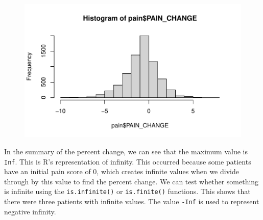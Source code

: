 \documentclass[
  letterpaper,
]{krantz}
\makeatletter
\newenvironment{Shaded}{\begin{snugshade}}{\end{snugshade}}
\newcommand{\CommentTok}[1]{\textcolor[rgb]{0.37,0.37,0.37}{#1}}
\newcommand{\FunctionTok}[1]{\textcolor[rgb]{0.28,0.35,0.67}{#1}}
\newcommand{\NormalTok}[1]{\textcolor[rgb]{0.00,0.23,0.31}{#1}}
\newcommand{\OtherTok}[1]{\textcolor[rgb]{0.00,0.23,0.31}{#1}}
\newcommand{\SpecialCharTok}[1]{\textcolor[rgb]{0.37,0.37,0.37}{#1}}
\newenvironment{kframe}{%
\medskip{}
\setlength{\fboxsep}{.8em}
 \def\at@end@of@kframe{}%
 \ifinner\ifhmode%
  \def\at@end@of@kframe{\end{minipage}}%
  \begin{minipage}{\columnwidth}%
 \fi\fi%
 \def\FrameCommand##1{\hskip\@totalleftmargin \hskip-\fboxsep
 \colorbox{shadecolor}{##1}\hskip-\fboxsep
     \hskip-\linewidth \hskip-\@totalleftmargin \hskip\columnwidth}%
 \MakeFramed {\advance\hsize-\width
   \@totalleftmargin\z@ \linewidth\hsize
   \@setminipage}}%
 {\par\unskip\endMakeFramed%
 \at@end@of@kframe}
\renewenvironment{Shaded}{\begin{kframe}}{\end{kframe}}
\makeatother
\begin{document}
\begin{figure}[H]

{\centering \includegraphics[width=1\textwidth,height=\textheight]{book/3_data_files_files/figure-pdf/unnamed-chunk-34-1.pdf}

}

\end{figure}

\begin{Shaded}
\end{Shaded}

In the summary of the percent change, we can see that the maximum value
is \texttt{Inf}. This is R's representation of infinity. This occurred
because some patients have an initial pain score of 0, which creates
infinite values when we divide through by this value to find the percent
change. We can test whether something is infinite using the
\texttt{is.infinite()} or \texttt{is.finite()} functions. This shows
that there were three patients with infinite values. The value
\texttt{-Inf} is used to represent negative infinity.

\begin{Shaded}
\end{Shaded}
\end{document}
